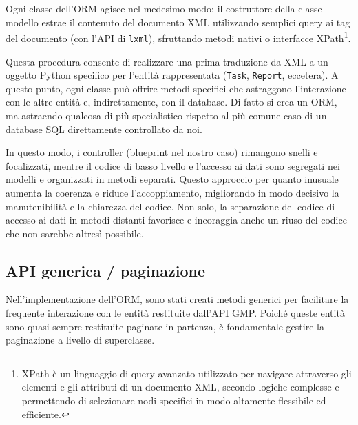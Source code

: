 Ogni classe dell'ORM agisce nel medesimo modo: il costruttore della classe modello estrae il contenuto del documento XML utilizzando semplici query ai tag del documento (con l'API di \texttt{lxml}), sfruttando metodi nativi o interfacce XPath\footnote{XPath è un linguaggio di query avanzato utilizzato per navigare attraverso gli elementi e gli attributi di un documento XML, secondo logiche complesse e permettendo di selezionare nodi specifici in modo altamente flessibile ed efficiente.}.

Questa procedura consente di realizzare una prima traduzione da XML a un oggetto Python specifico per l'entità rappresentata (\texttt{Task}, \texttt{Report}, eccetera). A questo punto, ogni classe può offrire metodi specifici che astraggono l'interazione con le altre entità e, indirettamente, con il database. Di fatto si crea un ORM, ma astraendo qualcosa di più specialistico rispetto al più comune caso di un database SQL direttamente controllato da noi.

In questo modo, i controller (blueprint nel nostro caso) rimangono snelli e focalizzati, mentre il codice di basso livello e l'accesso ai dati sono segregati nei modelli e organizzati in metodi separati. Questo approccio per quanto inusuale aumenta la coerenza e riduce l'accoppiamento, migliorando in modo decisivo la manutenibilità e la chiarezza del codice. Non solo, la separazione del codice di accesso ai dati in metodi distanti favorisce e incoraggia anche un riuso del codice che non sarebbe altresì possibile.

\subsection{API generica / paginazione}
Nell'implementazione dell'ORM, sono stati creati metodi generici per facilitare la frequente interazione con le entità restituite dall'API GMP. Poiché queste entità sono quasi sempre restituite paginate in partenza, è fondamentale gestire la paginazione a livello di superclasse.


